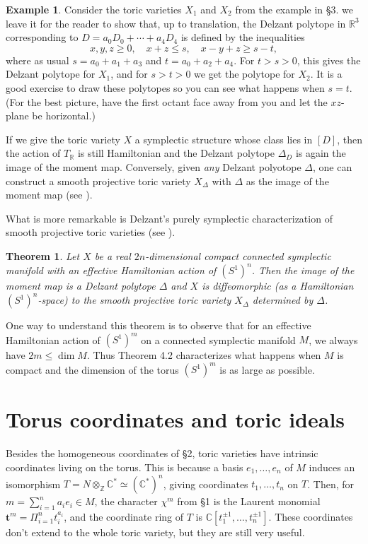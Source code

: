 \documentclass{amsart}
\theoremstyle{plain}
\newtheorem{theorem}{Theorem}[section]
\theoremstyle{definition}
\newtheorem*{example}{Example}
\begin{document}
\begin{example} Consider the toric varieties $X_1$ and $X_2$ from
the example in \S3.   we leave it for the reader to show that, up to
translation, the Delzant polytope in $\mathbb{R}^3$ corresponding to $D
= a_0D_0 + \cdots + a_4D_4$ is defined by the inequalities
\[
x,y,z \ge 0,\quad x+z \le s,\quad x-y+z \ge s-t,
\]
where as usual $s = a_0+a_1+a_3$ and $t = a_0+a_2+a_4$.  For $t > s >
0$, this gives the Delzant polytope for $X_1$, and for $s > t > 0$ we
get the polytope for $X_2$.  It is a good exercise to draw these
polytopes so you can see what happens when $s=t$.  (For the best
picture, have the first octant face away from you and let the
$xz$-plane be horizontal.)
\end{example}

	If we give the toric variety $X$ a symplectic structure whose
class lies in $[D]$, then the action of $T_{\mathbb{R}}$ is still
Hamiltonian and the Delzant polytope $\Delta_D$ is again the image of
the moment map.  Conversely, given {\it any\/} Delzant polyotope
$\Delta$, one can construct a smooth projective toric variety
$X_\Delta$ with $\Delta$ as the image of the moment map (see
\cite{Gui}).

	What is more remarkable is Delzant's purely symplectic
characterization of smooth projective toric varieties (see
\cite{Del}).

\begin{theorem} Let $X$ be a real $2n$-dimensional compact
connected symplectic manifold with an effective Hamiltonian action of
$(S^1)^n$.  Then the image of the moment map is a Delzant polytope
$\Delta$ and $X$ is diffeomorphic (as a Hamiltonian $(S^1)^n$-space)
to the smooth projective toric variety $X_\Delta$ determined by
$\Delta$.
\end{theorem}

	One way to understand this theorem is to observe that for an
effective Hamiltonian action of $(S^1)^m$ on a connected symplectic
manifold $M$, we always have $2m \le \dim M$.  Thus Theorem 4.2
characterizes what happens when $M$ is compact and the dimension of
the torus $(S^1)^m$ is as large as possible.


\section{Torus coordinates and toric ideals} 

	Besides the homogeneous coordinates of \S2, toric varieties
have intrinsic coordinates living on the torus.  This is because a
basis $e_1,\dots,e_n$ of $M$ induces an isomorphism $T =
N\otimes_{\mathbb{Z}}\mathbb{C}^* \simeq (\mathbb{C}^*)^n$, giving
coordinates $t_1,\dots,t_n$ on $T$.  Then, for $m = \sum_{i=1}^n a_i
e_i \in M$, the character $\chi^m$ from \S1 is the Laurent monomial
$\mathbf{t}^m = \Pi_{i=1}^n t_i^{a_i}$, and the coordinate ring of $T$
is $\mathbb{C}[t_1^{\pm1},\dots,t_n^{\pm1}]$.  These coordinates don't
extend to the whole toric variety, but they are still very useful.  
\end{document}
